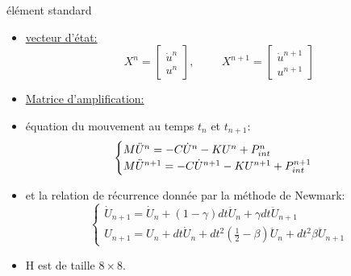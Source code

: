 \begin{frame}{élément standard}
\begin{itemize}
\item \underline{vecteur d'état:}
\begin{equation}
X^n = \begin{bmatrix}
\dot{u}^n \\
 u^n
\end{bmatrix}, \hspace{1cm} X^{n+1} = \begin{bmatrix}
\dot{u}^{n+1} \\
 u^{n+1}
\end{bmatrix}
\end{equation}
\item \underline{Matrice d'amplification: }
\item équation du mouvement au temps $t_{n}$ et $t_{n+1}$:
\begin{equation}
\begin{cases}
    M  \Ddot{U}^n = -C \Dot{U}^n - K U^n +P_{int}^n \\
    M \Ddot{U}^{n+1} = -C \Dot{U}^{n+1} - K U^{n+1} +P_{int}^{n+1} 
\end{cases}
\end{equation}
\item et la relation de récurrence donnée par la méthode de Newmark:
\begin{equation}
\begin{cases}
\dot{U}_{n+1} = \dot{U}_n + (1-\gamma)dt \ddot{U}_n + \gamma dt \ddot{U}_{n+1} \\
U_{n+1} = U_n +dt \dot{U}_n + dt^2 \left(\frac{1}{2}-\beta\right) \ddot{U}_n + dt^2 \beta \ddot{U}_{n+1}
\end{cases}
\end{equation}
\item H est de taille $8 \times 8$.
\end{itemize}
\end{frame}


